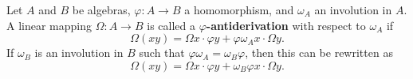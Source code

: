 Let $A$ and $B$ be algebras, $\varphi: A \to B$ a homomorphism, and $\omega_A$ an involution in $A$. A linear mapping $\Omega: A \to B$ is called a \textbf{$\varphi$-antiderivation} with respect to $\omega_A$ if
$$
\Omega(xy) = \Omega x \cdot \varphi y + \varphi \omega_A x \cdot \Omega y.
$$
If $\omega_B$ is an involution in $B$ such that $\varphi \omega_A = \omega_B \varphi$, then this can be rewritten as
$$
\Omega(xy) = \Omega x \cdot \varphi y + \omega_B \varphi x \cdot \Omega y.
$$
